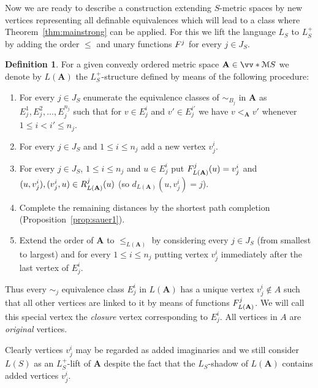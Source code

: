 \documentclass{elsarticle}
\def\ordclasssup#1#2{\vv*{#1}{#2}}
\def\str#1{\mathbf {#1}}
\def\nbrel#1#2{R\ifstrempty{#1}{}{_{#1}}\ifstrempty{#2}{}{^{#2}}}
\def\func#1#2{\nbfunc{\ifstrempty{#1}{}{\str{#1}}}{#2}}
\def\nbfunc#1#2{F\ifstrempty{#1}{}{_{#1}}\ifstrempty{#2}{}{^{#2}}}
\theoremstyle{plain}
\theoremstyle{definition}
\newtheorem{definition}[theorem]{Definition}
\theoremstyle{remark}
\begin{document}
Now we are ready to describe a construction extending $S$-metric spaces by new vertices
representing all definable equivalences which will lead to a class where Theorem~\ref{thm:mainstrong} can be applied.
For this we lift the language $L_S$ to $L^+_S$ by adding the order $\leq$ and unary functions $\func{}{j}$ for every
$j\in J_S$.
\begin{definition}
\label{defn:L}
For a given convexly ordered metric space $\str{A}\in \ordclasssup{\mathcal M}{S}$ we denote by $L(\str{A})$ the $L^+_S$-structure defined by means of the following procedure:
\begin{enumerate}[label=(\roman*)]
\item\label{step1} For every $j\in J_S$ enumerate the equivalence classes of $\sim_{B_j}$ in $\str{A}$ as $E^1_j, E^2_j,\allowbreak \ldots, E^{n_j}_j$ such that for $v\in E^i_j$ and $v'\in E^{i'}_j$ we have $v<_\str{A} v'$ whenever $1\leq i<i'\leq n_j$.
\item\label{step2} For every $j\in J_S$ and $1\leq i\leq n_j$ add a new vertex $v^i_j$.
\item\label{step3} For every $j\in J_S$, $1\leq i\leq n_j$ and $u\in E^i_j$ put $\nbfunc{L(\str{A})}{j}(u)=v^i_j$ and $(u,v^i_j),(v^i_j,u)\in \nbrel{L(\str{A})}{j}(u)$ (so $d_{L(\str{A})}(u,v^i_j)=j$).
\item\label{step4} Complete the remaining distances by the shortest path completion (Proposition~\ref{prop:sauer1}).
\item\label{step5} Extend the order of $\str{A}$ to $\leq_{L(\str{A})}$ by considering every $j\in J_S$ (from smallest to largest) and for every $1\leq i\leq n_j$ putting vertex $v^i_j$ immediately after the last vertex of $E^i_j$.
\end{enumerate}
\end{definition}
Thus every $\sim_j$ equivalence class $E^i_j$ in $L(\str{A})$ has a unique vertex $v^i_j\notin A$ such that all other vertices are linked to it by means of
functions $\nbfunc{L(\str{A})}{j}$.  We will call this special vertex the \emph{closure} vertex corresponding to $E^i_j$.
All vertices in $A$ are \emph{original} vertices.

Clearly vertices $v^i_j$ may be regarded as added imaginaries and we still consider $L(S)$ as an $L^+_S$-lift of $\str{A}$ despite the fact that the $L_S$-shadow of $L(\str{A})$ contains added vertices $v^i_j$.
\end{document}

